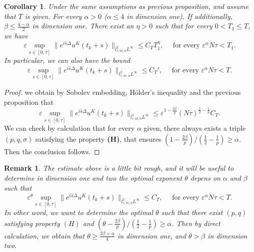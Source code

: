 \documentclass[10pt,a4paper]{article}
\newtheorem{corollary}[theorem]{Corollary}
\newtheorem{remark}[theorem]{Remark}
\begin{document}
  \begin{corollary}\label{uKl2Linfty}
    Under the same assumptions as previous proposition, and assume that \(T\) is
    given. For every \(\alpha > 0\) (\(\alpha\leq4\) in dimension one). If 
    additionally, \(\beta\leq\frac{4-\alpha}2\) in dimension one. There exist
    an \(\eta>0\) such that for every \(0< T_1 \leq T\), we have 
    \[ \varepsilon \sup_{s\in[0,\tau]} \|e^{i\hat{s}\Delta}u^K(t_k+s)\|_{l^2_{\tau,m,n}L^\infty} 
    \leq C_T T_1^\eta, \quad \text{ for every } \varepsilon^\alpha N \tau < T_1. \]
    In particular, we can also have the bound 
    \[ \varepsilon \sup_{s\in[0,\tau]} \|e^{i\hat{s}\Delta}u^K(t_k+s)\|_{l^2_{\tau,m,n}L^\infty} 
    \leq C_T', \quad \text{ for every } \varepsilon^\alpha N \tau < T. \]
  \end{corollary}

  \begin{proof}
    we obtain by Sobolev embedding, H\"older's inequality and the previous
    proposition that 
    \[ \varepsilon \sup_{s\in[0,\tau]} \|e^{i\hat{s}\Delta}u^K(t_k+s)\|_{l^2_{\tau,m,n}L^\infty}
    \leq \varepsilon^{1-\frac{2\beta}p} (N\tau)^{\frac12-\frac1p} C_T. \]
    We can check by calculation that for every \(\alpha\) given, there 
    always exists a triple \((p,q,\sigma)\) satisfying the property {\bf (H)}, 
    that ensures \((1-\frac{2\beta}p)/(\frac12-\frac1p) \geq \alpha\). Then the
    conclusion follows.
  \end{proof}
  
  \begin{remark}\label{remuKl2Linfty}
    The estimate above is a little bit rough, and it will be useful to determine 
    in dimension one and two the optimal exponent \(\theta\) depens on \(\alpha\) 
    and \(\beta\)  such that 
    \[ \varepsilon^\theta \sup_{s\in[0,\tau]} \|e^{i\hat{s}\Delta}u^K(t_k+s)\|_{l^2_{\tau,m,n}L^\infty} 
    \leq C_T, \quad \text{ for every } \varepsilon^\alpha N \tau < T. \]
    In other word, we want to determine the optimal \(\theta\) such that there
    exist \((p,q)\) satisfying property \((H)\) and 
    \((\theta-\frac{2\beta}p)/(\frac12-\frac1p) \geq \alpha\). Then by direct
    calculation, we obtain that \(\theta\geq \frac{2\beta+\alpha}4\) in dimension
    one, and \(\theta > \beta \) in dimension two.
  \end{remark}
\end{document}
